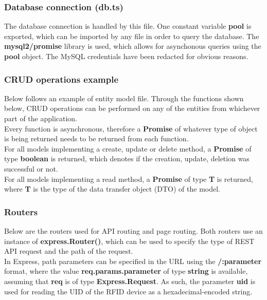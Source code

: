 \documentclass[a4paper,10pt]{article}
\begin{document}
\subsubsection{Database connection (db.ts)}

The database connection is handled by this file. One constant variable \textbf{pool} is exported, which can be imported by any file in order to query the database. The \textbf{mysql2/promise} library is used, which allows for asynchonous queries using the \textbf{pool} object. The MySQL credentials have been redacted for obvious reasons.



\subsubsection{CRUD operations example}

Below follows an example of entity model file. Through the functions shown below, CRUD operations can be performed on any of the entities from whichever part of the application. \\
Every function is asynchronous, therefore a \textbf{Promise} of whatever type of object is being returned needs to be returned from each function. \\
For all models implementing a create, update or delete method, a \textbf{Promise} of type \textbf{boolean} is returned, which denotes if the creation, update, deletion was successful or not. \\
For all models implementing a read method, a \textbf{Promise} of type \textbf{T} is returned, where \textbf{T} is the type of the data transfer object (DTO) of the model.


\newpage

\subsubsection{Routers}

Below are the routers used for API routing and page routing. Both routers use an instance of \textbf{express.Router()}, which can be used to specify the type of REST API request and the path of the request. \\
In Express, path parameters can be specified in the URL using the \textbf{/:parameter} format, where the value \textbf{req.params.parameter} of type \textbf{string} is available, assuming that \textbf{req} is of type \textbf{Express.Request}. As such, the parameter \textbf{uid} is used for reading the UID of the RFID device as a hexadecimal-encoded string.
\end{document}
